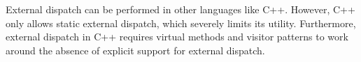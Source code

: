 External dispatch can be performed in other languages like C++. However,
C++ only allows static external dispatch, which severely limits its utility.
Furthermore, external dispatch in C++ requires virtual methods and visitor
patterns\cite{designpatterns} to work around the absence of explicit support
for external dispatch.

